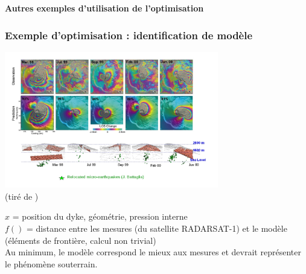 \documentclass[12pt]{beamer}
\begin{document}
\begin{frame}
\begin{center}
{ 
\textbf{
Autres exemples d'utilisation de l'optimisation
} %
}%
\end{center}
\end{frame}


\begin{frame}
\frametitle{Exemple d'optimisation : identification de modèle}
\begin{center}
\includegraphics[width=0.7\textwidth]{piton_fournaise.jpg}\\
\vspace{-1cm}
{\hfill\tiny (tiré de \cite{fukushima2010evolution})}
\end{center}
$x$ = position du dyke, géométrie, pression interne\\
$f()$ = distance entre les mesures (du satellite RADARSAT-1) et le modèle (éléments de frontière, calcul non trivial)\\
Au minimum, le modèle correspond le mieux aux mesures et devrait représenter le phénomène souterrain.
\end{frame}
\end{document}
